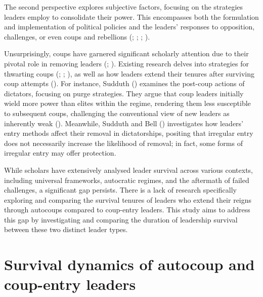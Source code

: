 \documentclass[
  12pt,
]{report}
\begin{document}
The second perspective explores subjective factors, focusing on the
strategies leaders employ to consolidate their power. This encompasses
both the formulation and implementation of political policies and the
leaders' responses to opposition, challenges, or even coups and
rebellions (;
;
;
).

Unsurprisingly, coups have garnered significant scholarly attention due
to their pivotal role in removing leaders
(;
). Existing research
delves into strategies for thwarting coups (; ;
), as well as how leaders
extend their tenures after surviving coup attempts
(). For instance,
Sudduth () examines the post-coup
actions of dictators, focusing on purge strategies. They argue that coup
leaders initially wield more power than elites within the regime,
rendering them less susceptible to subsequent coups, challenging the
conventional view of new leaders as inherently weak
(). Meanwhile, Sudduth and
Bell () investigates how leaders' entry
methods affect their removal in dictatorships, positing that irregular
entry does not necessarily increase the likelihood of removal; in fact,
some forms of irregular entry may offer protection.

While scholars have extensively analysed leader survival across various
contexts, including universal frameworks, autocratic regimes, and the
aftermath of failed challenges, a significant gap persists. There is a
lack of research specifically exploring and comparing the survival
tenures of leaders who extend their reigns through autocoups compared to
coup-entry leaders. This study aims to address this gap by investigating
and comparing the duration of leadership survival between these two
distinct leader types.

\section{Survival dynamics of autocoup and coup-entry
leaders}\label{survival-dynamics-of-autocoup-and-coup-entry-leaders}
\end{document}
